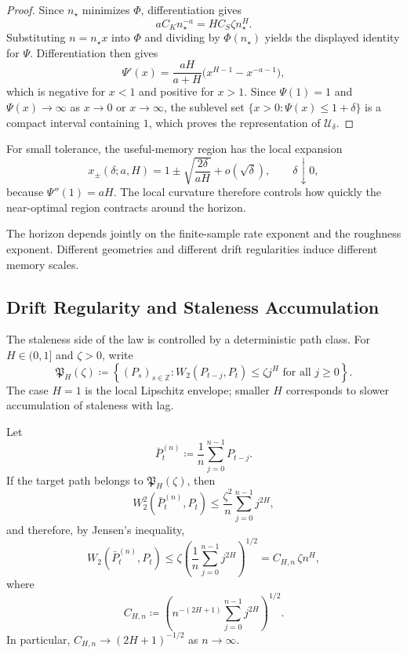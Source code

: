 \begin{proof}
Since $n_\star$ minimizes $\Phi$, differentiation gives
\[
  a C_K n_\star^{-a} = H C_S\zeta n_\star^H.
\]
Substituting $n=n_\star x$ into $\Phi$ and dividing by $\Phi(n_\star)$ yields
the displayed identity for $\Psi$. Differentiation then gives
\[
  \Psi'(x)=\frac{aH}{a+H}\bigl(x^{H-1}-x^{-a-1}\bigr),
\]
which is negative for $x<1$ and positive for $x>1$. Since $\Psi(1)=1$ and
$\Psi(x)\to\infty$ as $x\to 0$ or $x\to\infty$, the sublevel set
$\{x>0:\Psi(x)\le 1+\delta\}$ is a compact interval containing $1$, which
proves the representation of $\mathcal U_\delta$.
\end{proof}

For small tolerance, the useful-memory region has the local expansion
\[
  x_\pm(\delta;a,H) = 1 \pm \sqrt{\frac{2\delta}{aH}} + o(\sqrt{\delta}),
  \qquad \delta \downarrow 0,
\]
because $\Psi''(1)=aH$. The local curvature therefore controls how quickly the
near-optimal region contracts around the horizon.

The horizon depends jointly on the finite-sample rate exponent and the
roughness exponent. Different geometries and different drift regularities induce
different memory scales.

\subsection{Drift Regularity and Staleness Accumulation}

The staleness side of the law is controlled by a deterministic path class. For
$H\in(0,1]$ and $\zeta>0$, write
\[
  \mathfrak P_H(\zeta)
  \coloneqq
  \left\{(P_s)_{s\in\mathbb Z}: W_2(P_{t-j},P_t) \le \zeta j^H
  \text{ for all } j\ge 0\right\}.
\]
The case $H=1$ is the local Lipschitz envelope; smaller $H$ corresponds to slower
accumulation of staleness with lag.

\begin{lemma}
\label{lem:holder_staleness_bound}
Let
\[
  \bar P_t^{(n)} \coloneqq \frac{1}{n}\sum_{j=0}^{n-1} P_{t-j}.
\]
If the target path belongs to $\mathfrak P_H(\zeta)$, then
\[
  W_2^2\!\left(\bar P_t^{(n)},P_t\right)
  \le
  \frac{\zeta^2}{n}\sum_{j=0}^{n-1} j^{2H},
\]
and therefore, by Jensen's inequality,
\[
  W_2\!\left(\bar P_t^{(n)},P_t\right)
  \le \zeta\left(\frac{1}{n}\sum_{j=0}^{n-1} j^{2H}\right)^{1/2}
  = C_{H,n}\,\zeta n^H,
\]
where
\[
  C_{H,n}
  \coloneqq
  \left(n^{-(2H+1)}\sum_{j=0}^{n-1} j^{2H}\right)^{1/2}.
\]
In particular, $C_{H,n}\to (2H+1)^{-1/2}$ as $n\to\infty$.
\end{lemma}

